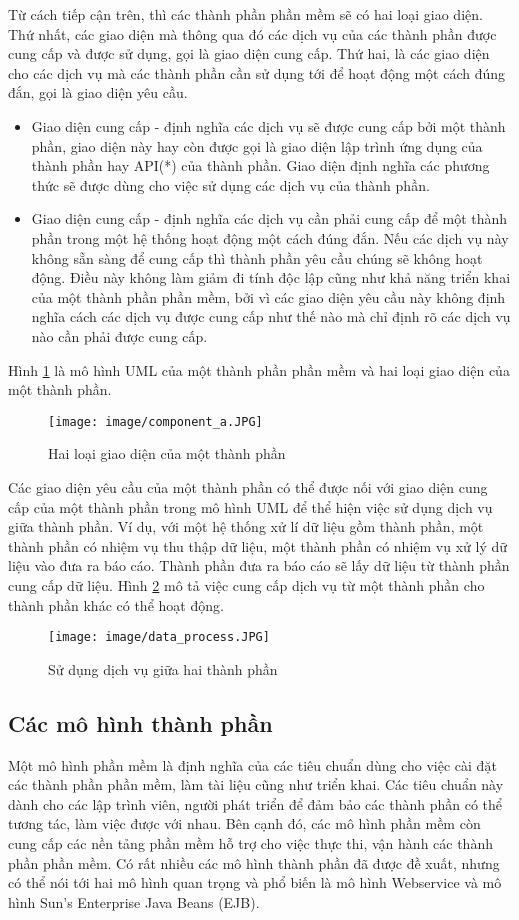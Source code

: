 Từ cách tiếp cận trên, thì các thành phần phần mềm sẽ có hai loại giao diện. Thứ nhất, các giao diện mà thông qua đó các dịch vụ của các thành phần được cung cấp và được sử dụng, gọi là giao diện cung cấp. Thứ hai, là các giao diện cho các dịch vụ mà các thành phần cần sử dụng tới để hoạt động một cách đúng đắn, gọi là giao diện yêu cầu.

\begin{itemize}
  \item Giao diện cung cấp - định nghĩa các dịch vụ sẽ được cung cấp bởi một thành phần, giao diện này hay còn được gọi là giao diện lập trình ứng dụng của thành phần hay API(*) của thành phần. Giao diện định nghĩa các phương thức sẽ được dùng cho việc sử dụng các dịch vụ của thành phần.
  \item Giao diện cung cấp - định nghĩa các dịch vụ cần phải cung cấp để một thành phần trong một hệ thống hoạt động một cách đúng đắn. Nếu các dịch vụ này không sẵn sàng để cung cấp thì thành phần yêu cầu chúng sẽ không hoạt động. Điều này không làm giảm đi tính độc lập cũng như khả năng triển khai của một thành phần phần mềm, bởi vì các giao diện yêu cầu này không định nghĩa cách các dịch vụ được cung cấp như thế nào mà chỉ định rõ các dịch vụ nào cần phải được cung cấp.
\end{itemize}
Hình \ref{fig:component_a} là mô hình UML của một thành phần phần mềm và hai loại giao diện của một thành phần.
	\begin{figure}[htbp]
		\centering
			\texttt{[image: image/component\_a.JPG]}
		\caption{Hai loại giao diện của một thành phần}
		\label{fig:component_a}
	\end{figure}
	
Các giao diện yêu cầu của một thành phần có thể được nối với giao diện cung cấp của một thành phần trong mô hình UML để thể hiện việc sử dụng dịch vụ giữa thành phần. Ví dụ, với một hệ thống xử lí dữ liệu gồm thành phần, một thành phần có nhiệm vụ thu thập dữ liệu, một thành phần có nhiệm vụ xử lý dữ liệu vào đưa ra báo cáo. Thành phần đưa ra báo cáo sẽ lấy dữ liệu từ thành phần cung cấp dữ liệu. Hình \ref{fig:data_process} mô tả việc cung cấp dịch vụ từ một thành phần cho thành phần khác có thể hoạt động.

\begin{figure}[htbp]
	\centering
		\texttt{[image: image/data\_process.JPG]}
	\caption{Sử dụng dịch vụ giữa hai thành phần}
	\label{fig:data_process}
\end{figure}


\subsection{Các mô hình thành phần}
Một mô hình phần mềm là định nghĩa của các tiêu chuẩn dùng cho việc cài đặt các thành phần phần mềm, làm tài liệu cũng như triển khai. Các tiêu chuẩn này dành cho các lập trình viên, người phát triển để đảm bảo các thành phần có thể tương tác, làm việc được với nhau. Bên cạnh đó, các mô hình phần mềm còn cung cấp các nền tảng phần mềm hỗ trợ cho việc thực thi, vận hành các thành phần phần mềm. Có rất nhiều các mô hình thành phần đã được đề xuất, nhưng có thể nói tới hai mô hình quan trọng và phổ biến là mô hình Webservice và mô hình Sun’s  Enterprise  Java  Beans  (EJB).

